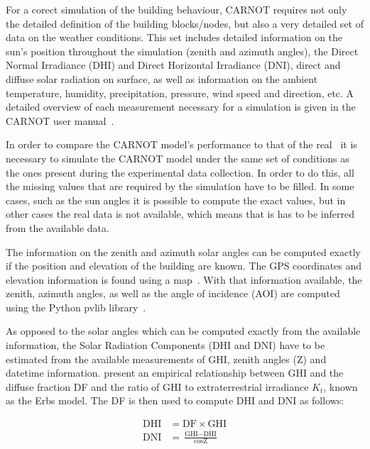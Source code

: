 For a corect simulation of the building behaviour, CARNOT requires not only the
detailed definition of the building blocks/nodes, but also a very detailed set
of data on the weather conditions. This set includes detailed information on the
sun's position throughout the simulation (zenith and azimuth angles), the Direct
Normal Irradiance (DHI) and Direct Horizontal Irradiance (DNI), direct and
diffuse solar radiation on surface, as well as information on the ambient
temperature, humidity, precipitation, pressure, wind speed and direction, etc.
A detailed overview of each measurement necessary for a simulation is given in
the CARNOT user manual~\cite{CARNOTManual}.

In order to compare the CARNOT model's performance to that of the real \pdome\
it is necessary to simulate the CARNOT model under the same set of conditions as
the ones present during the experimental data collection. In order to do this,
all the missing values that are required by the simulation have to be filled. In
some cases, such as the sun angles it is possible to compute the exact values,
but in other cases the real data is not available, which means that is has to be
inferred from the available data.

The information on the zenith and azimuth solar angles can be computed exactly
if the position and elevation of the building are known. The GPS coordinates and
elevation information is found using a map~\cite{ElevationFinder}. With that
information available, the zenith, azimuth angles, as well as the angle of
incidence (AOI) are computed using the Python pvlib
library~\cite{f.holmgrenPvlibPythonPython2018}.

As opposed to the solar angles which can be computed exactly from the available
information, the Solar Radiation Components (DHI and DNI) have to be estimated
from the available measurements of GHI, zenith angles (Z) and datetime
information.  \textcite{erbsEstimationDiffuseRadiation1982} present an empirical
relationship between GHI and the diffuse fraction DF and the ratio of GHI to
extraterrestrial irradiance $K_t$, known as the Erbs model. The DF is then used
to compute DHI and DNI as follows:

\begin{equation}
    \begin{aligned}
        \text{DHI} &= \text{DF} \times \text{GHI} \\
        \text{DNI} &= \frac{\text{GHI} - \text{DHI}}{\cos{\text{Z}}}
    \end{aligned}
\end{equation}

